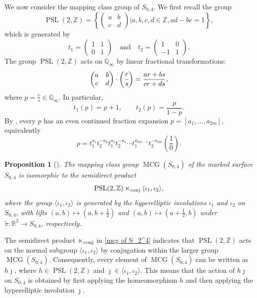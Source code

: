 \documentclass[11pt,a4paper,reqno]{amsart}%
\theoremstyle{plain}
\newtheorem{proposition}[proposition]{Proposition}
\theoremstyle{definition}
\numberwithin{equation}{section}
\numberwithin{equation}{section}
\def\<{\langle}
\def\>{\rangle}
\def\ZZ{\mathbb{Z}}
\newcommand{\QQi}{\mathbb{Q}_\infty}
\newcommand{\MCG}{\operatorname{MCG}}
\def\PSL{\operatorname{PSL}}
\begin{document}
We now consider the mapping class group of $S_{0,4}$. We first recall the group
\begin{equation*}
\PSL(2,\ZZ)=\left\{\begin{pmatrix}a&b\\c&d\end{pmatrix}\bigg| a,b,c,d\in\ZZ,ad-bc=1\right\},
\end{equation*}
which is generated by
\[
t_1=\begin{pmatrix}
1 & 1 \\
0 & 1
\end{pmatrix}\quad\text{and}\quad
t_2=\begin{pmatrix}
1 & 0 \\
-1 & 1
\end{pmatrix}.
\]
The group $\PSL(2,\ZZ)$ acts on $\QQi$ by linear fractional transformations:
\begin{equation}\label{eq:fl}
\begin{pmatrix}a&b\\c&d\end{pmatrix}\cdot\bigg(\cfrac{r}{s}\bigg)=\frac{ar+bs}{cr+ds},
\end{equation}
where $p=\frac{r}{s}\in\QQi$. In particular,
\[
t_1(p)=p+1,\qquad t_2(p)=\frac{p}{1-p}.
\]
By , every $p$ has an even continued fraction expansion $p=[a_1,\ldots,a_{2m}]$, equivalently
\begin{equation}\label{eq:expre}
p=t_1^{a_1}t_2^{-a_2}t_1^{a_3}t_2^{-a_4}\cdots t_1^{a_{2m-1}}t_2^{-a_{2m}}\left(\frac{1}{0}\right).
\end{equation}
 

\begin{proposition}[{\cite[Proposition~2.7]{FM}}]\label{prop:MCGofS42}
The mapping class group  $\MCG(S_{0,4})$ of the marked surface $S_{0,4}$ is isomorphic to the semidirect product 
\begin{equation}\label{mcg of S_2^4}
\PSL(2,\ZZ)\ltimes_{\rm conj} \<\iota_1,\iota_2\>,  
\end{equation}
where the group $ \<\iota_1,\iota_2\>$ is generated by the  hyperelliptic involutions $\iota_1$ and $\iota_2$  on
$S_{0,4}$, 
with lifts $(a,b)\mapsto (a,b+\frac{1}{2})$ and $(a,b)\mapsto (a+\frac{1}{2},b)$ under $\tilde{\pi}\colon\mathbb{R}^2\to S_{0,4}$, respectively.
\end{proposition}
 The semidirect product  $\ltimes_{\rm conj}$ in \eqref{mcg of S_2^4} indicates that   $\PSL(2,\ZZ)$  acts on the normal subgroup $\<\iota_1,\iota_2\>$ by conjugation within the
larger group $\MCG(S_{0,4})$.
Consequently, every element of $\MCG(S_{0,4})$   can be written as
$h \jmath$, where  $h \in \PSL(2,\ZZ)$  and  $ \jmath \in \<\iota_1,\iota_2\>$.
This  means that  the action of $h\jmath$
   on   $S_{0,4}$ is obtained by first applying the   homeomorphism $h $  and then applying the hyperelliptic involution $\jmath$.  
\end{document}
